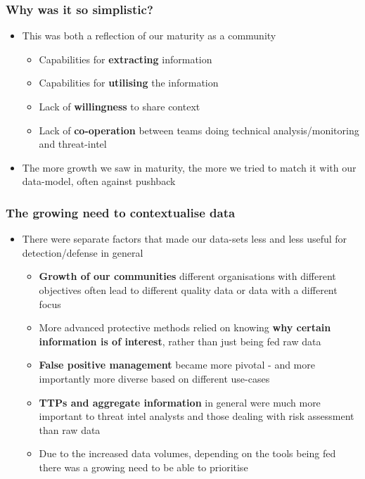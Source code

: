 \begin{frame}
  \frametitle{Why was it so simplistic?}
  \begin{itemize}
    \item This was both a reflection of our maturity as a community
    \begin{itemize}
      \item Capabilities for {\bf extracting} information
      \item Capabilities for {\bf utilising} the information
      \item Lack of {\bf willingness} to share context
      \item Lack of {\bf co-operation} between teams doing technical analysis/monitoring and threat-intel
    \end{itemize}
    \item The more growth we saw in maturity, the more we tried to match it with our data-model, often against pushback
  \end{itemize}
\end{frame}

\begin{frame}
\frametitle{The growing need to contextualise data}
\begin{itemize}
       \item There were separate factors that made our data-sets less and less useful for detection/defense in general
        \begin{itemize}
                \item {\bf Growth of our communities} different organisations with different objectives often lead to different quality data or data with a different focus
                \item More advanced protective methods relied on knowing {\bf why certain information is of interest}, rather than just being fed raw data
                \item {\bf False positive management} became more pivotal - and more importantly more diverse based on different use-cases
                \item {\bf TTPs and aggregate information} in general were much more important to threat intel analysts and those dealing with risk assessment than raw data
                \item Due to the increased data volumes, depending on the tools being fed there was a growing need to be able to prioritise
        \end{itemize}
\end{itemize}
\end{frame}

